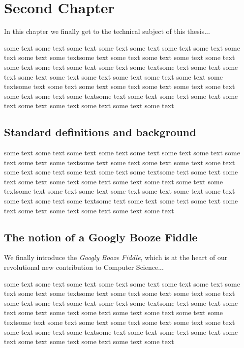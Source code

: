 \chapter{Second Chapter}
\label{chap:second}

In this chapter we finally get to the technical subject of this
thesis...

some text some text some text some text some text some text some text
some text some text some textsome text some text some text some text
some text some text some text some text some text some textsome text
some text some text some text some text some text some text some text
some text some textsome text some text some text some text some text
some text some text some text some text some textsome text some text
some text some text some text some text some text some text some text
some text

\section{Standard definitions and background}
\label{sec:definitions}

some text some text some text some text some text some text some text
some text some text some textsome text some text some text some text
some text some text some text some text some text some textsome text
some text some text some text some text some text some text some text
some text some textsome text some text some text some text some text
some text some text some text some text some textsome text some text
some text some text some text some text some text some text some text
some text

\section{The notion of a Googly Booze Fiddle}
\label{sec:notion}

We finally introduce the \emph{Googly Booze Fiddle}, which is at the
heart of our revolutional new contribution to Computer Science...

some text some text some text some text some text some text some text
some text some text some textsome text some text some text some text
some text some text some text some text some text some textsome text
some text some text some text some text some text some text some text
some text some textsome text some text some text some text some text
some text some text some text some text some textsome text some text
some text some text some text some text some text some text some text
some text



